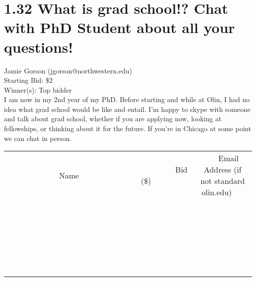 \documentclass[11pt]{article}
\begin{document}
\section*{1.32 What is grad school!? Chat with PhD Student about all your questions!}
Jamie Gorson (jgorson@northwestern.edu) \\
Starting Bid: \$2 \\
Winner(s): 
Top bidder \\
I am now in my 2nd year of my PhD. Before starting and while at Olin, I had no idea what grad school would be like and entail. I'm happy to skype with someone and talk about grad school, whether if you are applying now, looking at fellowships, or thinking about it for the future. If you're in Chicago at some point we can chat in person. \\[6ex]
\begin{tabular}{c c c}
~~~~~~~~~~~~~Name~~~~~~~~~~~~~ & ~~~~~~~~~Bid (\$)~~~~~~~~~ & ~~~Email Address (if not standard olin.edu)~~~ \\
 & & \\
\hline
 & & \\
\hline
 & & \\
\hline
 & & \\
\hline
 & & \\
\hline
 & & \\
\hline
 & & \\
\hline
 & & \\
\hline
 & & \\
\hline
 & & \\
\hline
 & & \\
\hline
 & & \\
\hline
 & & \\
\hline
 & & \\
\hline
 & & \\
\hline
 & & \\
\hline
 & & \\
\hline
 & & \\
\hline
 & & \\
\hline
 & & \\
\hline
 & & \\
\hline
 & & \\
\hline
 & & \\
\hline
 & & \\
\hline
 & & \\
\hline
 & & \\
\hline
\end{tabular}
\clearpage
\end{document}
